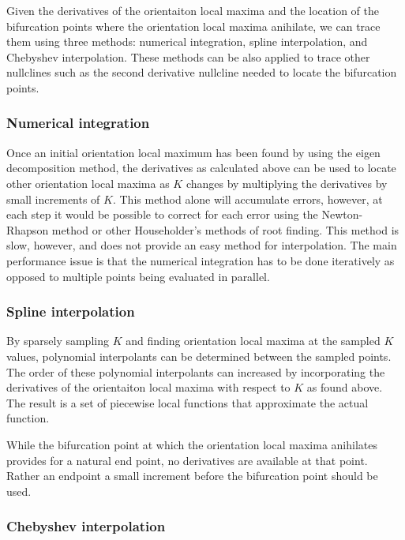 \documentclass[11pt]{article} %
\begin{document}
Given the derivatives of the orientaiton local maxima and the location of the bifurcation points where the orientation local maxima anihilate, we can trace them using three methods: numerical integration, spline interpolation, and Chebyshev interpolation. These methods can be also applied to trace other nullclines such as the second derivative nullcline needed to locate the bifurcation points.

\subsubsection{Numerical integration}

Once an initial orientation local maximum has been found by using the eigen decomposition method, the derivatives as calculated above can be used to locate other orientation local maxima as $ K $ changes by multiplying the derivatives by small increments of $ K $. This method alone will accumulate errors, however, at each step it would be possible to correct for each error using the Newton-Rhapson method or other Householder's methods of root finding. This method is slow, however, and does not provide an easy method for interpolation. The main performance issue is that the numerical integration has to be done iteratively as opposed to multiple points being evaluated in parallel.

\subsubsection{Spline interpolation}

By sparsely sampling $ K $ and finding orientation local maxima at the sampled $ K $ values, polynomial interpolants can be determined between the sampled points. The order of these polynomial interpolants can increased by incorporating the derivatives of the orientaiton local maxima with respect to $ K $ as found above. The result is a set of piecewise local functions that approximate the actual function.

While the bifurcation point at which the orientation local maxima anihilates provides for a natural end point, no derivatives are available at that point. Rather an endpoint a small increment before the bifurcation point should be used.

\subsubsection{Chebyshev interpolation}
\end{document}
